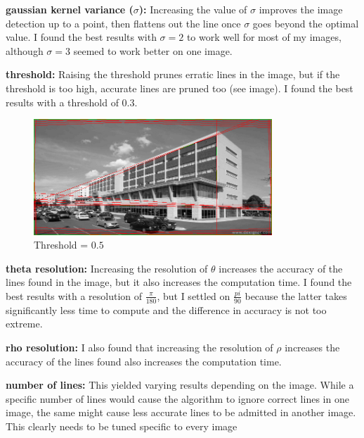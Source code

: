 \begin{enumroman}
  \item \textbf{gaussian kernel variance ($\sigma$):}
    Increasing the value of $\sigma$ improves the image detection up to a point,
    then flattens out the line once $\sigma$ goes beyond the optimal value.
    I found the best results with $\sigma = 2$ to work well for most of my images,
    although $\sigma = 3$ seemed to work better on one image.
  \item \textbf{threshold:}
    Raising the threshold prunes erratic lines in the image,
    but if the threshold is too high, accurate lines are pruned too
    (see image).
    I found the best results with a threshold of $0.3$.

    \begin{figure}[h]
      \centering
      \includegraphics[width=0.8\textwidth]{09-threshold-0.5.png}
      \caption{Threshold = $0.5$}
      \label{fig:threshold}
    \end{figure}
  \item \textbf{theta resolution:}
    Increasing the resolution of $\theta$ increases the accuracy
    of the lines found in the image, but it also increases the
    computation time. I found the best results with a resolution
    of $\frac{\pi}{180}$, but I settled on $\frac{pi}{90}$
    because the latter takes significantly less time to compute
    and the difference in accuracy is not too extreme.

  \item \textbf{rho resolution:}
    I also found that increasing the resolution of $\rho$
    increases the accuracy of the lines found
    also increases the computation time.

  \item \textbf{number of lines:}
    This yielded varying results depending on the image.
    While a specific number of lines would cause the algorithm
    to ignore correct lines in one image, the same might cause less
    accurate lines to be admitted in another image.
    This clearly needs to be tuned specific to every image
\end{enumroman}


